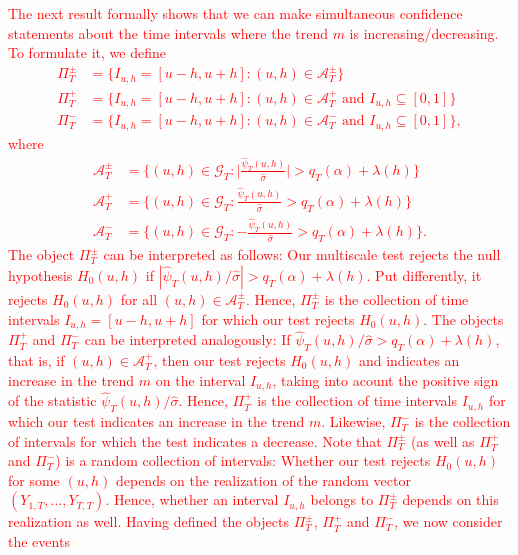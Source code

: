 \textcolor{red}{
The next result formally shows that we can make simultaneous confidence statements about the time intervals where the trend $m$ is increasing/decreasing. To formulate it, we define 
\begin{align*}
\Pi_T^\pm  & = \big\{ I_{u,h} = [u-h,u+h]: (u,h) \in \mathcal{A}_T^\pm \big\} \\
\Pi_T^+ & = \big\{ I_{u,h} = [u-h,u+h]: (u,h) \in \mathcal{A}_T^+ \text{ and } I_{u,h} \subseteq [0,1] \big\} \\
\Pi_T^- & = \big\{ I_{u,h} = [u-h,u+h]: (u,h) \in \mathcal{A}_T^- \text{ and } I_{u,h} \subseteq [0,1] \big\}, 
\end{align*}
where 
\begin{align*}
\mathcal{A}_T^\pm & = \Big\{ (u,h) \in \mathcal{G}_T: \Big|\frac{\widehat{\psi}_T(u,h)}{\widehat{\sigma}}\Big| > q_T(\alpha) + \lambda(h) \Big\} \\ 
\mathcal{A}_T^+  & = \Big\{ (u,h) \in \mathcal{G}_T: \frac{\widehat{\psi}_T(u,h)}{\widehat{\sigma}} > q_T(\alpha) + \lambda(h) \Big\} \\ 
\mathcal{A}_T^-  & = \Big\{ (u,h) \in \mathcal{G}_T: -\frac{\widehat{\psi}_T(u,h)}{\widehat{\sigma}} > q_T(\alpha) + \lambda(h) \Big\}. 
\end{align*}
The object $\Pi_T^\pm$ can be interpreted as follows: Our multiscale test rejects the null hypo\-thesis $H_0(u,h)$ if $|\widehat{\psi}_T(u,h)/\widehat{\sigma}| > q_T(\alpha) + \lambda(h)$. Put differently, it rejects $H_0(u,h)$ for all $(u,h) \in \mathcal{A}_T^\pm$. Hence, $\Pi_T^\pm$ is the collection of time intervals $I_{u,h} = [u-h,u+h]$ for which our test rejects $H_0(u,h)$. The objects $\Pi_T^+$ and $\Pi_T^-$ can be interpreted analogously: If $\widehat{\psi}_T(u,h)/\widehat{\sigma} > q_T(\alpha) + \lambda(h)$, that is, if $(u,h) \in \mathcal{A}_T^+$, then our test rejects $H_0(u,h)$ and indicates an increase in the trend $m$ on the interval $I_{u,h}$, taking into acount the positive sign of the statistic $\widehat{\psi}_T(u,h)/\widehat{\sigma}$. Hence, $\Pi_T^+$ is the collection of time intervals $I_{u,h}$ for which our test indicates an increase in the trend $m$. Likewise, $\Pi_T^-$ is the collection of intervals for which the test indicates a decrease. Note that $\Pi_T^{\pm}$ (as well as $\Pi_T^+$ and $\Pi_T^-$) is a random collection of intervals: Whether our test rejects $H_0(u,h)$ for some $(u,h)$ depends on the realization of the random vector $(Y_{1,T},\ldots,Y_{T,T})$. Hence, whether an interval $I_{u,h}$ belongs to $\Pi_T^{\pm}$ depends on this realization as well. Having defined the objects $\Pi_T^\pm$, $\Pi_T^+$ and $\Pi_T^-$, we now consider the events}
